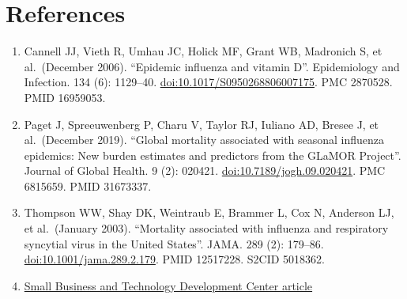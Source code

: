 \documentclass[
]{article}
\providecommand{\tightlist}{%
  \setlength{\itemsep}{0pt}\setlength{\parskip}{0pt}}
\begin{document}
\newpage

\hypertarget{references}{%
\section{References}\label{references}}

\begin{enumerate}
\def\labelenumi{\arabic{enumi}.}
\tightlist
\item
  Cannell JJ, Vieth R, Umhau JC, Holick MF, Grant WB, Madronich S, et
  al.~(December 2006). ``Epidemic influenza and vitamin D''.
  Epidemiology and Infection. 134 (6): 1129--40.
  \url{doi:10.1017/S0950268806007175}. PMC 2870528. PMID 16959053.
\item
  Paget J, Spreeuwenberg P, Charu V, Taylor RJ, Iuliano AD, Bresee J, et
  al.~(December 2019). ``Global mortality associated with seasonal
  influenza epidemics: New burden estimates and predictors from the
  GLaMOR Project''. Journal of Global Health. 9 (2): 020421.
  \url{doi:10.7189/jogh.09.020421}. PMC 6815659. PMID 31673337.
\item
  Thompson WW, Shay DK, Weintraub E, Brammer L, Cox N, Anderson LJ, et
  al.~(January 2003). ``Mortality associated with influenza and
  respiratory syncytial virus in the United States''. JAMA. 289 (2):
  179--86. \url{doi:10.1001/jama.289.2.179}. PMID 12517228. S2CID
  5018362.
\item
  \href{https://sbtdc.org/resources/recovery/pandemic-flu/}{Small
  Business and Technology Development Center article}
\end{enumerate}
\end{document}
